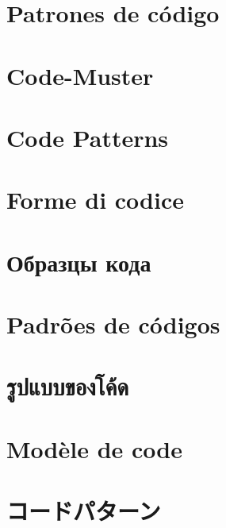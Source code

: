 \ifdefined\SPANISH
\chapter{Patrones de código}
\fi %

\ifdefined\GERMAN
\chapter{Code-Muster}
\fi %

\ifdefined\ENGLISH
\chapter{Code Patterns}
\fi %

\ifdefined\ITALIAN
\chapter{Forme di codice}
\fi %

\ifdefined\RUSSIAN
\chapter{Образцы кода}
\fi %

\ifdefined\BRAZILIAN
\chapter{Padrões de códigos}
\fi %

\ifdefined\THAI
\chapter{รูปแบบของโค้ด}
\fi %

\ifdefined\FRENCH
\chapter{Modèle de code}
\fi %

\ifdefined\POLISH
\chapter{\PLph{}}
\fi %

\ifdefined\JAPANESE
\chapter{コードパターン}
\fi %

\EN{}
\ES{}
\ITA{}
\PTBR{}
\RU{}
\THA{}
\DE{}
\FR{}
\PL{}
\JPN{}


